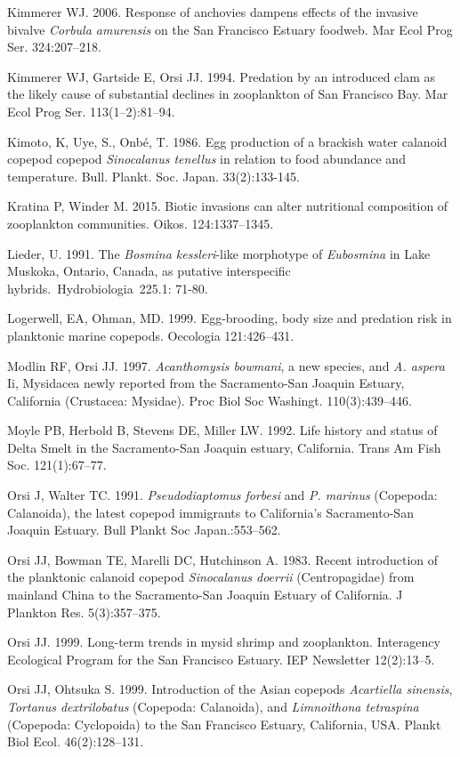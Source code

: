 \documentclass[
  letterpaper,
]{article}
\begin{document}
Kimmerer WJ. 2006. Response of anchovies dampens effects of the invasive
bivalve \emph{Corbula amurensis} on the San Francisco Estuary foodweb.
Mar Ecol Prog Ser. 324:207--218.

Kimmerer WJ, Gartside E, Orsi JJ. 1994. Predation by an introduced clam
as the likely cause of substantial declines in zooplankton of San
Francisco Bay. Mar Ecol Prog Ser. 113(1--2):81--94.

Kimoto, K, Uye, S., Onbé, T. 1986. Egg production of a brackish water
calanoid copepod copepod \emph{Sinocalanus tenellus} in relation to food
abundance and temperature. Bull. Plankt. Soc. Japan. 33(2):133-145.

Kratina P, Winder M. 2015. Biotic invasions can alter nutritional
composition of zooplankton communities. Oikos. 124:1337--1345.

Lieder, U. 1991. The \emph{Bosmina kessleri}-like morphotype of
\emph{Eubosmina} in Lake Muskoka, Ontario, Canada, as putative
interspecific hybrids.~Hydrobiologia~225.1: 71-80.

Logerwell, EA, Ohman, MD. 1999. Egg-brooding, body size and predation
risk in planktonic marine copepods. Oecologia 121:426--431.

Modlin RF, Orsi JJ. 1997. \emph{Acanthomysis bowmani}, a new species,
and \emph{A. aspera} Ii, Mysidacea newly reported from the
Sacramento-San Joaquin Estuary, California (Crustacea: Mysidae). Proc
Biol Soc Washingt. 110(3):439--446.

Moyle PB, Herbold B, Stevens DE, Miller LW. 1992. Life history and
status of Delta Smelt in the Sacramento-San Joaquin estuary, California.
Trans Am Fish Soc. 121(1):67--77.

Orsi J, Walter TC. 1991. \emph{Pseudodiaptomus forbesi} and \emph{P.
marinus} (Copepoda: Calanoida), the latest copepod immigrants to
California's Sacramento-San Joaquin Estuary. Bull Plankt Soc
Japan.:553--562.

Orsi JJ, Bowman TE, Marelli DC, Hutchinson A. 1983. Recent introduction
of the planktonic calanoid copepod \emph{Sinocalanus doerrii}
(Centropagidae) from mainland China to the Sacramento-San Joaquin
Estuary of California. J Plankton Res. 5(3):357--375.

Orsi JJ. 1999. Long-term trends in mysid shrimp and zooplankton.
Interagency Ecological Program for the San Francisco Estuary. IEP
Newsletter 12(2):13--5.

Orsi JJ, Ohtsuka S. 1999. Introduction of the Asian copepods
\emph{Acartiella sinensis}, \emph{Tortanus dextrilobatus} (Copepoda:
Calanoida), and \emph{Limnoithona tetraspina} (Copepoda: Cyclopoida) to
the San Francisco Estuary, California, USA. Plankt Biol Ecol.
46(2):128--131.
\end{document}
